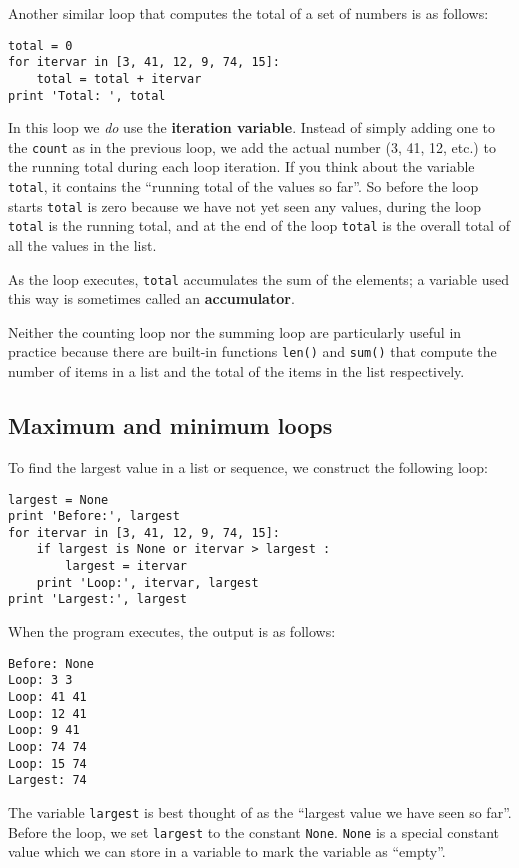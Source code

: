 Another similar loop that computes the total of a set of numbers
is as follows:

\beforeverb
\begin{verbatim}
total = 0
for itervar in [3, 41, 12, 9, 74, 15]:
    total = total + itervar
print 'Total: ', total
\end{verbatim}
\afterverb
%
In this loop we \emph{do} use the {\bf iteration variable}.
Instead of simply adding one to the {\tt count} as in the previous loop, 
we add the actual number (3, 41, 12, etc.) to the running 
total during each loop iteration.
If you think about the variable {\tt total}, it contains the 
``running total of the values so far''.  So before the loop
starts {\tt total} is zero because we have not yet seen any values,
during the loop {\tt total} is the running total, and at the end of 
the loop {\tt total} is the overall total of all the values 
in the list.

As the loop executes, {\tt total} accumulates the sum of the
elements; a variable used this way is sometimes called an
{\bf accumulator}.

Neither the counting loop nor the summing loop are particularly 
useful in practice because there are built-in functions 
{\tt len()} and {\tt sum()} that compute the number of 
items in a list and the total of the items in the list
respectively.

\subsection{Maximum and minimum loops}

\label{maximumloop}
To find the largest value in a list or sequence, we construct the
following loop:

\beforeverb
\begin{verbatim}
largest = None
print 'Before:', largest
for itervar in [3, 41, 12, 9, 74, 15]:
    if largest is None or itervar > largest :
        largest = itervar
    print 'Loop:', itervar, largest
print 'Largest:', largest
\end{verbatim}
\afterverb
%
When the program executes, the output is as follows:

\beforeverb
\begin{verbatim}
Before: None
Loop: 3 3
Loop: 41 41
Loop: 12 41
Loop: 9 41
Loop: 74 74
Loop: 15 74
Largest: 74
\end{verbatim}
\afterverb
%
The variable {\tt largest} is best thought of as 
the ``largest value we have seen so far''.
Before the loop, we set {\tt largest} to the constant {\tt None}.  
{\tt None} is a special constant value which we can 
store in a variable to mark 
the variable as ``empty''.  

